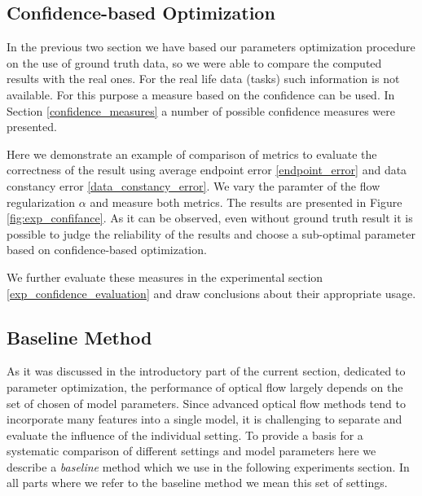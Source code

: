 \subsection{Confidence-based Optimization}



In the previous two section we have based our parameters optimization procedure on the use of ground truth data, so we were able to compare the computed results with the real ones. For the real life data (tasks) such information is not available. For this purpose a measure based on the confidence can be used. In Section \ref{confidence_measures} a number of possible confidence measures were presented.

Here we demonstrate an example of comparison of metrics to evaluate the correctness of the result using average endpoint error \ref{endpoint_error} and data constancy error \ref{data_constancy_error}. We vary the paramter of the flow regularization $\alpha$ and measure both metrics. The results are presented in Figure \ref{fig:exp_confifance}.
As it can be observed, even without ground truth result it is possible to judge the reliability of the results and choose a sub-optimal parameter based on confidence-based optimization. 


 We further evaluate these measures in the experimental section \ref{exp_confidence_evaluation} and draw conclusions about their appropriate usage. 



\subsection{Baseline Method}
\label{baseline_method}


As it was discussed in the introductory part of the current section, dedicated to parameter optimization, the performance of optical flow largely depends on the set of chosen of model parameters. Since advanced optical flow methods tend to incorporate many features into a single model, it is challenging to separate and evaluate the influence of the individual setting. To provide a basis for a systematic comparison of different settings and model parameters here we describe a \textit{baseline} method which we use in the following experiments section. In all parts where we refer to the baseline method we mean this set of settings.



